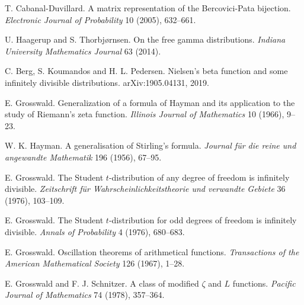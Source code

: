  T. Cabanal-Duvillard. A matrix representation of the Bercovici-Pata bijection. \emph{Electronic Journal of Probability} 10 (2005), 632--661.

 U. Haagerup and S. Thorbj{\o}rnsen. On the free gamma distributions. \emph{Indiana University Mathematics Journal} 63 (2014).

 C. Berg, S. Koumandos and H. L. Pedersen. Nielsen's beta function and some infinitely divisible distributions. arXiv:1905.04131, 2019.

 E. Grosswald. Generalization of a formula of Hayman and its application to the study of Riemann's zeta function. \emph{Illinois Journal of Mathematics} 10 (1966), 9--23.

 W. K. Hayman. A generalisation of Stirling's formula. \emph{Journal f\"ur die reine und angewandte Mathematik} 196 (1956), 67--95.

 E. Grosswald. The Student $t$-distribution of any degree of freedom is infinitely divisible. \emph{Zeitschrift f\"ur Wahrscheinlichkeitstheorie und verwandte Gebiete} 36 (1976), 103--109.

 E. Grosswald. The Student $t$-distribution for odd degrees of freedom is infinitely divisible. \emph{Annals of Probability} 4 (1976), 680--683.

 E. Grosswald. Oscillation theorems of arithmetical functions. \emph{Transactions of the American Mathematical Society} 126 (1967), 1--28.

 E. Grosswald and F. J. Schnitzer. A class of modified $\zeta$ and $L$ functions. \emph{Pacific Journal of Mathematics} 74 (1978), 357--364.

